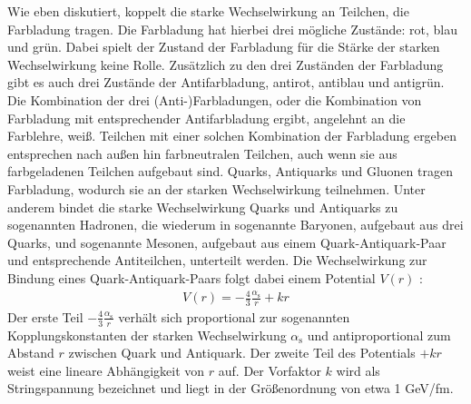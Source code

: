 Wie eben diskutiert, koppelt die starke Wechselwirkung an Teilchen, die Farbladung tragen.
Die Farbladung hat hierbei drei mögliche Zustände: rot, blau und grün.
Dabei spielt der Zustand der Farbladung für die Stärke der starken Wechselwirkung keine Rolle.
Zusätzlich zu den drei Zuständen der Farbladung gibt es auch drei Zustände der Antifarbladung, antirot, antiblau und antigrün.
\newline
Die Kombination der drei (Anti-)Farbladungen, oder die Kombination von Farbladung mit ent\-spre\-chender Antifarbladung ergibt, angelehnt an die Farblehre, weiß.
Teilchen mit einer solchen Kombination der Farbladung ergeben entsprechen nach außen hin farbneutralen Teilchen, auch wenn sie aus farbgeladenen Teilchen aufgebaut sind.
\newline
Quarks, Antiquarks und Gluonen tragen Farbladung, wodurch sie an der starken Wechselwirkung teilnehmen.
Unter anderem bindet die starke Wechselwirkung Quarks und Antiquarks zu sogenannten Hadronen, die wiederum in sogenannte Baryonen, aufgebaut aus drei Quarks, und sogenannte Mesonen, aufgebaut aus einem Quark-Antiquark-Paar und entsprechende Antiteilchen, unterteilt werden.
\newline
Die Wechselwirkung zur Bindung eines Quark-Antiquark-Paars folgt dabei einem Potential $V(r)$ \cite{script:kt1}:
\begin{align} \label{eq:Potential}
V(r) = -\frac{4}{3}\frac{\alpha_\text{s}}{r} + kr 
\end{align}
Der erste Teil $-\frac{4}{3}\frac{\alpha_\text{s}}{r}$ verhält sich proportional zur sogenannten Kopplungskonstanten der starken Wechselwirkung $\alpha_{\text{s}}$ und antiproportional zum Abstand $r$ zwischen Quark und Antiquark.
\newline
Der zweite Teil des Potentials $+kr$ weist eine lineare Abhängigkeit von $r$ auf.
Der Vorfaktor $k$ wird als Stringspannung bezeichnet und liegt in der Größenordnung von etwa 1 GeV/fm.
